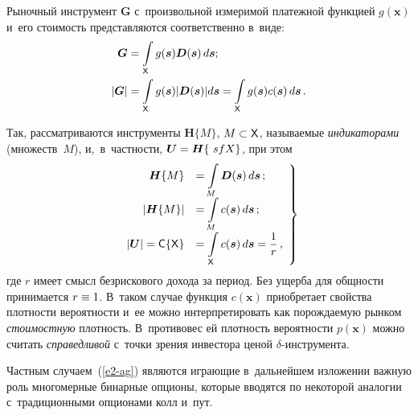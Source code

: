 \begin{multicols}{2}
  Рыночный инструмент $\boldsymbol{G}$ с~произвольной измеримой платежной 
функцией $g(\boldsymbol{x})$ и~его стоимость представляются соответственно в~виде:
 \begin{align*}
  \boldsymbol{G}&=\int\limits_{\sf X} g(\boldsymbol{s}) \boldsymbol{D}(\boldsymbol{s})\,d\boldsymbol{s};\\
  \vert \boldsymbol{G}\vert &= \int\limits_{\sf X} g(\boldsymbol{s})\vert \boldsymbol{D}(\boldsymbol{s})\vert 
d\boldsymbol{s}=\int\limits_{\sf X} g(\boldsymbol{s}) c(\boldsymbol{s})\,d\boldsymbol{s}\,.
  \end{align*}
  
  Так, рассматриваются инструменты $\boldsymbol{H}\{M\}$, $M \hm\subset {\sf X}$, 
называемые \textit{индикаторами} (множеств~$M$), и,~в~частности, 
$\boldsymbol{U}\hm= \boldsymbol{H}\{{\ sf X}\}$, при этом 
  \begin{equation}
  \left.
  \begin{array}{rl}
  \boldsymbol{H}\{M\} &=\displaystyle \int\limits_M \boldsymbol{D}(\boldsymbol{s})\,d\boldsymbol{s}\,;\\[13pt]
  \vert \boldsymbol{H}\{M\}\vert &= \displaystyle \int\limits_M c(\boldsymbol{s})\,d\boldsymbol{s}\,;\\[13pt]
  \vert \boldsymbol{U}\vert={\sf C}\{\mathsf{X}\} &=\displaystyle \int\limits_{\mathsf X}  c
  (\boldsymbol{s})\,d\boldsymbol{s}=\displaystyle\displaystyle\frac{\displaystyle 1\mathstrut}{\displaystyle r\mathstrut}\,,
  \end{array}
  \right\}
  \label{e2-ag}
  \end{equation}
где $r$ имеет смысл безрискового дохода за период. Без ущерба для общности 
принимается $r\hm\equiv  1$. В~таком случае функция $c(\boldsymbol{x})$ приобретает 
свойства плот\-ности вероятности и~ее можно интерпретировать как 
порождаемую рынком \textit{стоимостную} плот\-ность. В~противовес ей 
плотность вероятности $p(\boldsymbol{x})$ можно считать \textit{справедливой} с~точки 
зрения ин\-вес\-то\-ра ценой $\delta$-ин\-стру\-мента. 
  
  Частным случаем~(\ref{e2-ag}) являются играющие в~дальнейшем изложении 
важную роль многомерные бинарные опционы, которые вводятся по некоторой 
аналогии с~традиционными опционами колл и~пут. 
  

\end{multicols}
